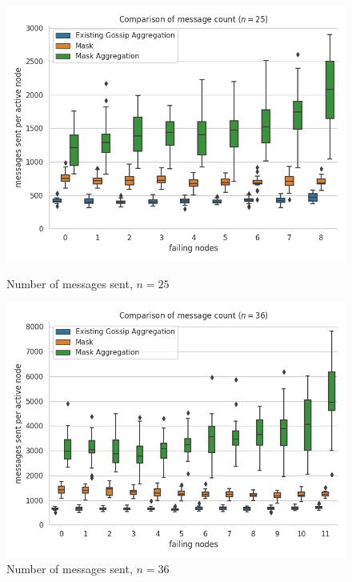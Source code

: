 \begin{figure}[H]
    \centering
    \begin{minipage}{0.5\textwidth}
        \centering
        \includegraphics[width=\textwidth]{images/aggregation_bandwidth_msg_tx_sum_25.png}
        \captionsetup{labelformat=empty}
        \caption{Number of messages sent, $n = 25$}
    \end{minipage}\hfill
    \begin{minipage}{0.5\textwidth}
        \centering
        \includegraphics[width=\textwidth]{images/aggregation_bandwidth_msg_tx_sum_36.png}
        \captionsetup{labelformat=empty}
        \caption{Number of messages sent, $n = 36$}
    \end{minipage}\hfill
\end{figure}

